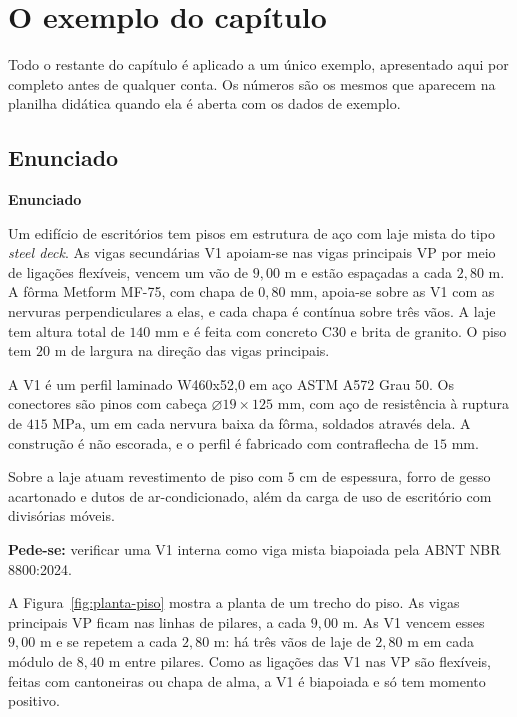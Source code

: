 \documentclass[11pt,a4paper]{article}
\newcommand{\caixaconceito}[2]{%
  \par\vspace{6pt}\noindent\colorbox{calloutbg}{%
    \parbox{\dimexpr\linewidth-2\fboxsep\relax}{%
      \vspace{4pt}\textbf{\color{primary}#1}\par\vspace{3pt}#2\vspace{4pt}%
    }%
  }\par\vspace{6pt}%
}
\begin{document}
\section{O exemplo do capítulo}

Todo o restante do capítulo é aplicado a um único exemplo, apresentado aqui por completo antes de qualquer conta. Os números são os mesmos que aparecem na planilha didática quando ela é aberta com os dados de exemplo.

\subsection{Enunciado}

\caixaconceito{Enunciado}{%
Um edifício de escritórios tem pisos em estrutura de aço com laje mista do tipo \textit{steel deck}. As vigas secundárias V1 apoiam-se nas vigas principais VP por meio de ligações flexíveis, vencem um vão de $9{,}00\text{ m}$ e estão espaçadas a cada $2{,}80\text{ m}$. A fôrma Metform MF-75, com chapa de $0{,}80\text{ mm}$, apoia-se sobre as V1 com as nervuras perpendiculares a elas, e cada chapa é contínua sobre três vãos. A laje tem altura total de $140\text{ mm}$ e é feita com concreto C30 e brita de granito. O piso tem $20\text{ m}$ de largura na direção das vigas principais.\par\vspace{4pt}
A V1 é um perfil laminado W460x52,0 em aço ASTM A572 Grau 50. Os conectores são pinos com cabeça $\varnothing 19 \times 125\text{ mm}$, com aço de resistência à ruptura de $415\text{ MPa}$, um em cada nervura baixa da fôrma, soldados através dela. A construção é não escorada, e o perfil é fabricado com contraflecha de $15\text{ mm}$.\par\vspace{4pt}
Sobre a laje atuam revestimento de piso com $5\text{ cm}$ de espessura, forro de gesso acartonado e dutos de ar-condicionado, além da carga de uso de escritório com divisórias móveis.\par\vspace{4pt}
\textbf{Pede-se:} verificar uma V1 interna como viga mista biapoiada pela ABNT NBR 8800:2024.}

A Figura~\ref{fig:planta-piso} mostra a planta de um trecho do piso. As vigas principais VP ficam nas linhas de pilares, a cada $9{,}00\text{ m}$. As V1 vencem esses $9{,}00\text{ m}$ e se repetem a cada $2{,}80\text{ m}$: há três vãos de laje de $2{,}80\text{ m}$ em cada módulo de $8{,}40\text{ m}$ entre pilares. Como as ligações das V1 nas VP são flexíveis, feitas com cantoneiras ou chapa de alma, a V1 é biapoiada e só tem momento positivo.
\end{document}

